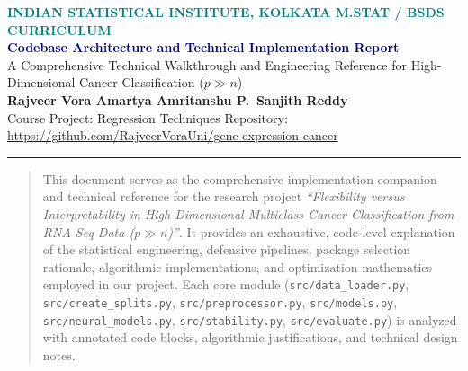 \documentclass[10pt,a4paper]{article}
\newcommand{\condheading}{\fontfamily{cmss}\selectfont}
\begin{document}
\begin{center}
  {\footnotesize\bfseries\textcolor{teal}{INDIAN STATISTICAL INSTITUTE, KOLKATA \quad\textbar\quad M.STAT / BSDS CURRICULUM}}\\[0.2cm]
  {\condheading\bfseries\LARGE\textcolor{navy}{Codebase Architecture and Technical Implementation Report}}\\[0.15cm]
  {\normalsize\textcolor{mutedgrey}{A Comprehensive Technical Walkthrough and Engineering Reference for High-Dimensional Cancer Classification ($p \gg n$)}}\\[0.25cm]
  {\small\textbf{\textcolor{charcoal}{Rajveer Vora \quad\textbar\quad Amartya Amritanshu \quad\textbar\quad P.\ Sanjith Reddy}}}\\[0.1cm]
  {\footnotesize\textcolor{mutedgrey}{Course Project: Regression Techniques \quad\textbar\quad Repository: \url{https://github.com/RajveerVoraUni/gene-expression-cancer}}}\\[0.25cm]
  {\color{linegrey}\hrule height 0.8pt}
\end{center}

\vspace{0.15cm}

\begin{abstract}
\noindent This document serves as the comprehensive implementation companion and technical reference for the research project \emph{``Flexibility versus Interpretability in High Dimensional Multiclass Cancer Classification from RNA-Seq Data ($p \gg n$)''}. It provides an exhaustive, code-level explanation of the statistical engineering, defensive pipelines, package selection rationale, algorithmic implementations, and optimization mathematics employed in our project. Each core module (\texttt{src/data\_loader.py}, \texttt{src/create\_splits.py}, \texttt{src/preprocessor.py}, \texttt{src/models.py}, \texttt{src/neural\_models.py}, \texttt{src/stability.py}, \texttt{src/evaluate.py}) is analyzed with annotated code blocks, algorithmic justifications, and technical design notes.
\end{abstract}

\vspace{0.2cm}
\tableofcontents
\vspace{0.3cm}
\vspace{0.4cm}

\end{document}
